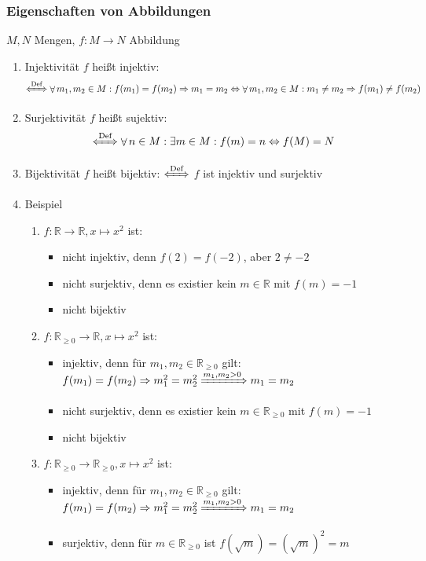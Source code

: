 \documentclass[11pt]{article}
\DeclareMathOperator{\Forall}{\forall}
\begin{document}
\subsubsection{Eigenschaften von Abbildungen}
\label{sec-2-6-7}
$M,N$ Mengen, $f:M\to N$ Abbildung
\begin{enumerate}
\item Injektivität
\label{sec-2-6-7-1}
$f$ heißt injektiv: \[\xLeftrightarrow{\text{Def}} \Forall m_1,m_2\in M: f(m_1) = f(m_2) \Rightarrow m_1 = m_2 \Leftrightarrow \Forall m_1,m_2\in M: m_1\neq m_2 \Rightarrow f(m_1)\neq f(m_2)\]
\item Surjektivität
\label{sec-2-6-7-2}
$f$ heißt sujektiv:
\[\xLeftrightarrow{\text{Def}} \Forall n\in M :\exists m\in M: f(m) = n \Leftrightarrow f(M) = N\]
\item Bijektivität
\label{sec-2-6-7-3}
$f$ heißt bijektiv: $\xLeftrightarrow{\text{Def}}$ $f$ ist injektiv und surjektiv
\item Beispiel
\label{sec-2-6-7-4}
\begin{enumerate}
\item $f:\mathbb{R}\to\mathbb{R},x\mapsto x^2$ ist:
\begin{itemize}
\item nicht injektiv, denn $f(2) = f(-2)$, aber $2\neq -2$
\item nicht surjektiv, denn es existier kein $m\in\mathbb{R}$ mit $f(m) = -1$
\item nicht bijektiv
\end{itemize}
\item $f:\mathbb{R}_{\geq 0} \to \mathbb{R}, x\mapsto x^2$ ist:
\begin{itemize}
\item injektiv, denn für $m_1,m_2 \in\mathbb{R}_{\geq 0}$ gilt: $f(m_1) = f(m_2) \Rightarrow m_1^2 = m_2^2 \xRightarrow{m_1,m_2 > 0} m_1 = m_2$
\item nicht surjektiv, denn es existier kein $m\in\mathbb{R}_{\geq 0}$ mit $f(m) = -1$
\item nicht bijektiv
\end{itemize}
\item $f:\mathbb{R}_{\geq 0} \to \mathbb{R}_{\geq 0}, x\mapsto x^2$ ist:
\begin{itemize}
\item injektiv, denn für $m_1,m_2 \in\mathbb{R}_{\geq 0}$ gilt: $f(m_1) = f(m_2) \Rightarrow m_1^2 = m_2^2 \xRightarrow{m_1,m_2 > 0} m_1 = m_2$
\item surjektiv, denn für $m\in\mathbb{R}_{\geq 0}$ ist $f(\sqrt{m}) = (\sqrt{m})^2 = m$

\end{itemize}
\end{enumerate}
\end{enumerate}
\end{document}
